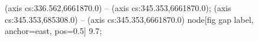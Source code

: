  (axis cs:336.562,6661870.0) -- (axis cs:345.353,6661870.0);
 (axis cs:345.353,685308.0) -- (axis cs:345.353,6661870.0)
  node[fig gap label, anchor=east, pos=0.5] {\texttimes{}9.7};

